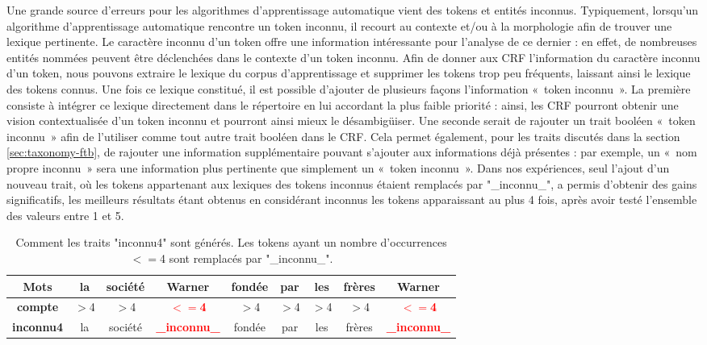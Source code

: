 \documentclass[citation\_needed]{subfiles}
\begin{document}
Une grande source d'erreurs pour les algorithmes d'apprentissage automatique vient des tokens et entités inconnus. Typiquement, lorsqu'un algorithme d'apprentissage automatique rencontre un token inconnu, il recourt au contexte et/ou à la morphologie afin de trouver une lexique pertinente. Le caractère inconnu d'un token offre une information intéressante pour l'analyse de ce dernier : en effet, de nombreuses entités nommées peuvent être déclenchées dans le contexte d'un token inconnu. Afin de donner aux CRF l'information du caractère inconnu d'un token, nous pouvons extraire le lexique du corpus d'apprentissage et supprimer les tokens trop peu fréquents, laissant ainsi le lexique des tokens connus. Une fois ce lexique constitué, il est possible d'ajouter de plusieurs façons l'information «\ token inconnu\ ». La première consiste à intégrer ce lexique directement dans le répertoire en lui accordant la plus faible priorité : ainsi, les CRF pourront obtenir une vision contextualisée d'un token inconnu et pourront ainsi mieux le désambigüiser. Une seconde serait de rajouter un trait booléen «\ token inconnu\ » afin de l'utiliser comme tout autre trait booléen dans le CRF. Cela permet également, pour les traits discutés dans la section \ref{sec:taxonomy-ftb}, de rajouter une information supplémentaire pouvant s'ajouter aux informations déjà présentes : par exemple, un «\ nom propre inconnu\ » sera une information plus pertinente que simplement un «\ token inconnu\ ». Dans nos expériences, seul l'ajout d'un nouveau trait, où les tokens appartenant aux lexiques des tokens inconnus étaient remplacés par "\_inconnu\_", a permis d'obtenir des gains significatifs, les meilleurs résultats étant obtenus en considérant inconnus les tokens apparaissant au plus 4 fois, après avoir testé l'ensemble des valeurs entre 1 et 5.

\begin{table}[ht!]
\centering
\begin{tabular}{|c|cccccccc|}
\hline
\textbf{Mots}   & la   & société & Warner                     & fondée & par  & les  & frères & Warner \\
\hline
\textbf{compte} & $>$4 & $>$4    & \textbf{\textcolor{red}{$<=$4}}   & $>$4   & $>$4 & $>$4 & $>$4   & \textbf{\textcolor{red}{$<=$4}} \\
\textbf{inconnu4}    & la   & société & \textbf{\textcolor{red}{\_inconnu\_}} & fondée & par  & les  & frères & \textbf{\textcolor{red}{\_inconnu\_}}  \\
\hline
\end{tabular}
\caption{Comment les traits "inconnu4" sont générés. Les tokens ayant un nombre d'occurrences $<=$4 sont remplacés par "\_inconnu\_".}
\end{table}
\end{document}
